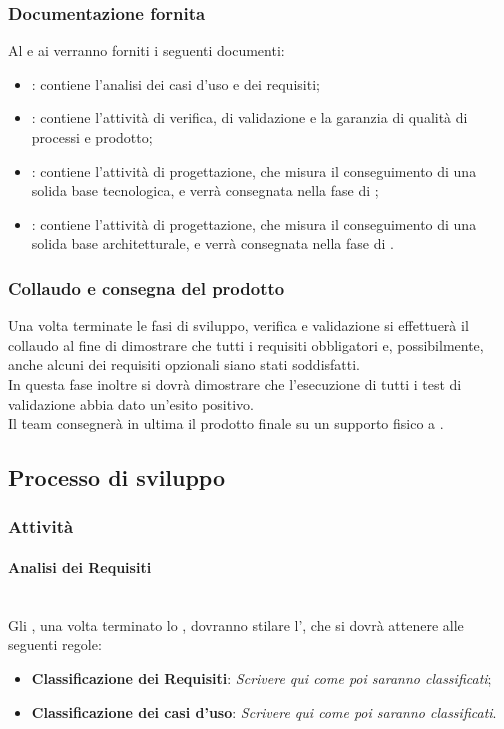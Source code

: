 \subsubsection{Documentazione fornita}
Al \proponente{} e ai \committenti{} verranno forniti i seguenti documenti:
\begin{itemize}
	\item \textbf{\AdR}: contiene l'analisi dei casi d'uso e dei requisiti;
	\item \textbf{\PdQ}: contiene l'attività di verifica, di validazione e la garanzia di qualità di processi e prodotto;
	\item \textbf{\ST}: contiene l'attività di progettazione, che misura il conseguimento di una solida base tecnologica, e verrà consegnata nella fase di \RP;
	\item \textbf{\DdP}: contiene l'attività di progettazione, che misura il conseguimento di una solida base architetturale, e verrà consegnata nella fase di \RQ.
\end{itemize}

\subsubsection{Collaudo e consegna del prodotto}
Una volta terminate le fasi di sviluppo, verifica e validazione si effettuerà il collaudo al fine di dimostrare che tutti i requisiti obbligatori e, possibilmente, anche alcuni dei requisiti opzionali siano stati soddisfatti. 
\\In questa fase inoltre si dovrà dimostrare che l'esecuzione di tutti i test di validazione abbia dato un'esito positivo.
\\Il team consegnerà in ultima il prodotto finale su un supporto fisico a \committenti.

\subsection{Processo di sviluppo}
\subsubsection{Attività}
\paragraph{Analisi dei Requisiti}
	~\\Gli \anas, una volta terminato lo \SdF, dovranno stilare l'\AdR, che si dovrà attenere alle seguenti regole:
	\begin{itemize}
	\item \textbf{Classificazione dei Requisiti}:
	\textit{Scrivere qui come poi saranno classificati};
	\item \textbf{Classificazione dei casi d'uso}:
	\textit{Scrivere qui come poi saranno classificati}.
	\end{itemize}
